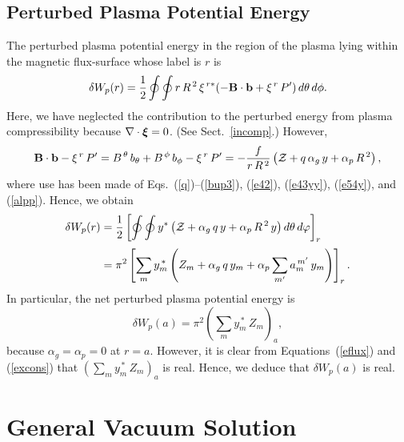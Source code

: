 \documentclass[12pt,prb,aps]{revtex4-1}
\newcommand {\bxi}{\mbox{\boldmath$\xi$}}
\begin{document}
\subsection{Perturbed Plasma Potential Energy}
The perturbed plasma potential energy in the region of the plasma lying within the magnetic flux-surface whose label is $r$ is\,\cite{tj1,gs1}
\begin{equation}
\delta W_p(r) = \frac{1}{2}\oint\oint r\,R^{\,2}\,\xi^{\,r\ast}(-{\bf B}\cdot{\bf b} + \xi^{\,r}\,P')\,d\theta\,d\phi.
\end{equation}
Here, we have neglected the contribution to the perturbed energy from plasma compressibility because $\nabla\cdot\bxi= 0$. (See Sect.~\ref{incomp}.)
However,
\begin{equation}
{\bf B}\cdot{\bf b} -\xi^{\,r}\,P' = B^{\,\theta}\,b_\theta+B^{\,\phi}\,b_\phi - \xi^{\,r}\,P'
= - \frac{f}{r\,R^{\,2}}\left({\cal Z} + q\,\alpha_g\,y + \alpha_p\,R^{\,2}\right),
\end{equation}
where use has been made of Eqs.~(\ref{q})--(\ref{bup3}), (\ref{e42}), (\ref{e43yy}), (\ref{e54y}),  and (\ref{alpp}). Hence,
we obtain
\begin{align}\label{e87j}
\delta W_p(r) &=\frac{1}{2}\left[\oint\oint y^{\ast}\left({\cal Z} + \alpha_g \,q\,y+ \alpha_p\,R^{\,2}\, y\right)d\theta\,d\varphi\right]_r\nonumber\\[0.5ex]
&=\pi^2\left[\sum_{m}y_m^{\,\ast}\left(Z_m + \alpha_g \,q\,y_m+ \alpha_p\sum_{m'}a_m^{\,m'}\, y_m\right)\right]_r.
\end{align}
 In particular,  the net perturbed plasma potential energy is 
 \begin{equation}\label{e7.34yi}
 \delta W_p(a) =  \pi^2\left(\sum_{m}y_m^{\,\ast}\,Z_m \right)_a,
 \end{equation}
 because $\alpha_g=\alpha_p =0$ at $r=a$. However, it is clear from Equations~(\ref{eflux}) and (\ref{excons}) that $(\sum_m y_m^{\,\ast}\,Z_m)_a$ is real. 
 Hence, we deduce that $\delta W_p(a)$ is real. 

\section{General Vacuum Solution}\label{vacuum}
\end{document}
